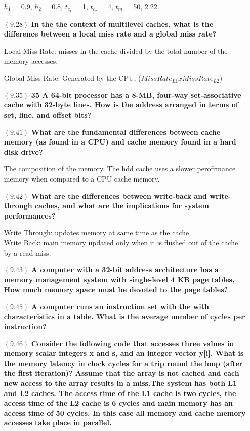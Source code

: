 \documentclass[letterpaper,10pt,titlepage]{article}
\begin{document}
\begin{enumerate}
$h_1$ = 0.9, $h_2$ = 0.8, $t_{c_1}$ = 1, $t_{c_2}$ = 4, $t_m$ = 50,    2.22

\item[$(9.28)$] \textbf{In the  the context of multilevel caches, what is the difference between a local miss rate and a global miss rate?}

Local Miss Rate: misses in the cache divided by the total number of the memory accesses.

Global Miss Rate: Generated by the CPU, ($Miss Rate_{L1} x Miss Rate_{L2}$)

\item[$(9.35)$] \textbf{35 A 64-bit processor has a 8-MB, four-way set-associative cache with 32-byte lines. How is the address arranged in terms of set, line, and offset bits?}

\item[$(9.41)$] \textbf{What are the fundamental differences between cache memory (as found in a CPU) and cache memory found in a hard disk drive?}

The composition of the memory. The hdd cache uses a slower perofrmance memory when compared to a CPU cache memory.

\item[$(9.42)$] \textbf{What are the differences between write-back and write-through caches, and what are the implications for system performances?}

Write Through: updates memory at same time as the cache\\
Write Back: main memory updated only when it is flushed out of the cache by a read miss.

\item[$(9.43)$] \textbf{A computer with a 32-bit address architecture has a memory management system with single-level 4 KB page tables, How much memory space must be devoted to the page tables?}

\item[$(9.45)$] \textbf{A computer runs an instruction set with the with characteristics in a table. What is the average number of cycles per instruction?}

\item[$(9.46)$] \textbf{Consider the following code that accesses three values in memory scalar integers x and s, and an integer vector y[i]. What is the memory latency in clock cycles for a trip round the loop (after the first iteration)? Assume that the array is not cached and each new access to the array results in a miss.The system has both L1 and L2 caches. The access time of the L1 cache is two cycles, the access time of the L2 cache is 6 cycles and main memory has an access time of 50 cycles. In this case all memory and cache memory accesses take place in parallel.}


\end{enumerate}
\end{document}
